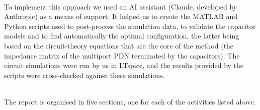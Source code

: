 \noindent\\ To implement this approach we used an AI assistant (Claude, developed by Anthropic) as a means of support. It helped us to create the
MATLAB and Python scripts used to post-process the simulation data, to validate the capacitor models and to find automatically the optimal
configuration, the latter being based on the circuit-theory equations that are the core of the method (the impedance matrix of the multiport PDN
terminated by the capacitors). The circuit simulations were run by us in LTspice, and the results provided by the scripts were cross-checked against
these simulations.

\noindent\\ The report is organised in five sections, one for each of the activities listed above.